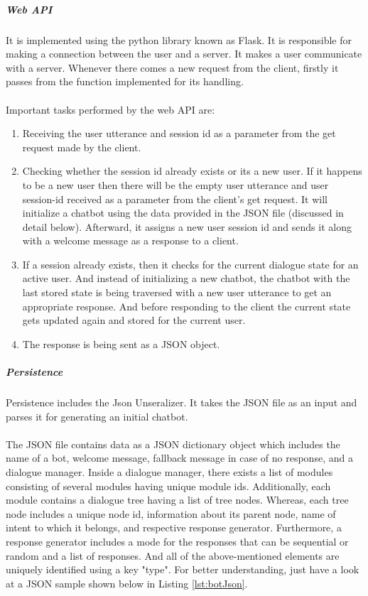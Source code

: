 \subparagraph*{Web API}
It is implemented using the python library known as Flask. It is responsible for making a connection between the user and a server. It makes a user communicate with a server. Whenever there comes a new request from the client, firstly it passes from the function implemented for its handling.
\\~\\
Important tasks performed by the web API are:
\begin{enumerate}
    \item Receiving the user utterance and session id as a parameter from the get request made by the client.
    \item Checking whether the session id already exists or its a new user. If it happens to be a new user then there will be the empty user utterance and user session-id received as a parameter from the client's get request. It will initialize a chatbot using the data provided in the JSON file (discussed in detail below). Afterward, it assigns a new user session id and sends it along with a welcome message as a response to a client.
    \item If a session already exists, then it checks for the current dialogue state for an active user. And instead of initializing a new chatbot, the chatbot with the last stored state is being traversed with a new user utterance to get an appropriate response. And before responding to the client the current state gets updated again and stored for the current user.
     \item The response is being sent as a JSON object.
\end{enumerate} 

\subparagraph*{Persistence}
Persistence includes the Json Unseralizer. It takes the JSON file as an input and parses it for generating an initial chatbot.
\\~\\
The JSON file contains data as a JSON dictionary object which includes the name of a bot, welcome message, fallback message in case of no response, and a dialogue manager. Inside a dialogue manager, there exists a list of modules consisting of several modules having unique module ids. Additionally, each module contains a dialogue tree having a list of tree nodes. Whereas, each tree node includes a unique node id, information about its parent node, name of intent to which it belongs, and respective response generator. Furthermore, a response generator includes a mode for the responses that can be sequential or random and a list of responses. And all of the above-mentioned elements are uniquely identified using a key "type". For better understanding, just have a look at a JSON sample shown below in Listing \ref{lst:botJson}.

